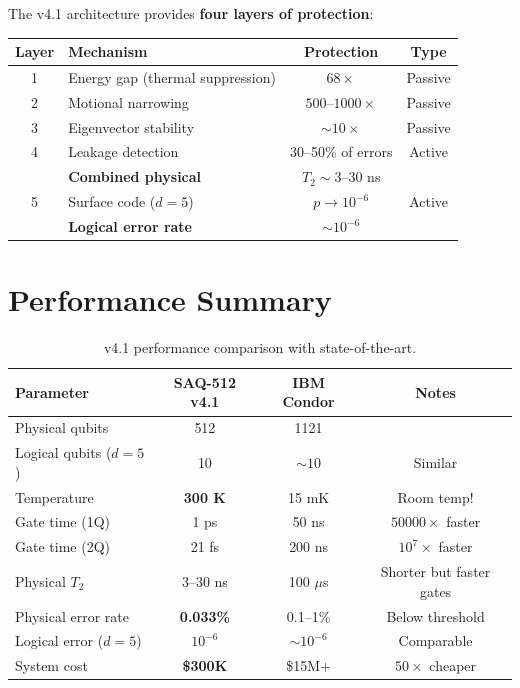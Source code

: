 \documentclass[11pt,a4paper]{article}
\theoremstyle{definition}
\begin{document}
\begin{keyresult}
The v4.1 architecture provides \textbf{four layers of protection}:

\begin{center}
\begin{tabular}{clcc}
\toprule
Layer & Mechanism & Protection & Type \\
\midrule
1 & Energy gap (thermal suppression) & $68\times$ & Passive \\
2 & Motional narrowing & $500$--$1000\times$ & Passive \\
3 & Eigenvector stability & $\sim 10\times$ & Passive \\
4 & Leakage detection & 30--50\% of errors & Active \\
\midrule
& \textbf{Combined physical} & $T_2 \sim 3$--30 ns & \\
\midrule
5 & Surface code ($d=5$) & $p \to 10^{-6}$ & Active \\
\midrule
& \textbf{Logical error rate} & $\sim 10^{-6}$ & \\
\bottomrule
\end{tabular}
\end{center}
\end{keyresult}

\section{Performance Summary}

\begin{table}[h]
\centering
\begin{tabular}{lccc}
\toprule
\textbf{Parameter} & \textbf{SAQ-512 v4.1} & \textbf{IBM Condor} & \textbf{Notes} \\
\midrule
Physical qubits & 512 & 1121 & \\
Logical qubits ($d=5$) & 10 & $\sim 10$ & Similar \\
Temperature & \textbf{300 K} & 15 mK & Room temp! \\
Gate time (1Q) & 1 ps & 50 ns & $50000\times$ faster \\
Gate time (2Q) & 21 fs & 200 ns & $10^7\times$ faster \\
Physical $T_2$ & 3--30 ns & 100 $\mu$s & Shorter but faster gates \\
Physical error rate & \textbf{0.033\%} & 0.1--1\% & Below threshold \\
Logical error ($d=5$) & $10^{-6}$ & $\sim 10^{-6}$ & Comparable \\
System cost & \textbf{\$300K} & \$15M+ & $50\times$ cheaper \\
\bottomrule
\end{tabular}
\caption{v4.1 performance comparison with state-of-the-art.}
\end{table}
\end{document}

